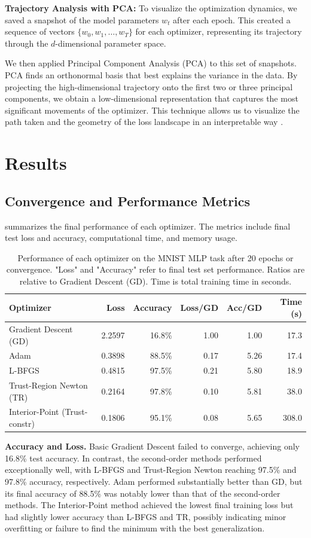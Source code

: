 \documentclass[20pt]{article}
\begin{document}
\textbf{Trajectory Analysis with PCA:}
To visualize the optimization dynamics, we saved a snapshot of the model parameters $w_t$ after each epoch. This created a sequence of vectors $\{w_0, w_1, \dots, w_T\}$ for each optimizer, representing its trajectory through the $d$-dimensional parameter space.

We then applied Principal Component Analysis (PCA) to this set of snapshots. PCA finds an orthonormal basis that best explains the variance in the data. By projecting the high-dimensional trajectory onto the first two or three principal components, we obtain a low-dimensional representation that captures the most significant movements of the optimizer. This technique allows us to visualize the path taken and the geometry of the loss landscape in an interpretable way \cite{Li2018visualizing}.

\clearpage
\section{Results} \label{results}
\subsection{Convergence and Performance Metrics}
 summarizes the final performance of each optimizer. The metrics include final test loss and accuracy, computational time, and memory usage.

\begin{table}[ht]\centering
\small %
\caption{Performance of each optimizer on the MNIST MLP task after 20 epochs or convergence. "Loss" and "Accuracy" refer to final test set performance. Ratios are relative to Gradient Descent (GD). Time is total training time in seconds.}
\label{tab:performance}
\begin{tabular}{lrrrrr}
\toprule
Optimizer & Loss & Accuracy & Loss/GD & Acc/GD & Time (s) \\
\midrule
Gradient Descent (GD) & 2.2597 & 16.8\% & 1.00 & 1.00 & 17.3 \\
Adam & 0.3898 & 88.5\% & 0.17 & 5.26 & 17.4 \\
L-BFGS & 0.4815 & 97.5\% & 0.21 & 5.80 & 18.9 \\
Trust-Region Newton (TR) & 0.2164 & 97.8\% & 0.10 & 5.81 & 38.0 \\
Interior-Point (Trust-constr) & 0.1806 & 95.1\% & 0.08 & 5.65 & 308.0 \\
\bottomrule
\end{tabular}
\end{table}
\clearpage
\textbf{Accuracy and Loss.} Basic Gradient Descent failed to converge, achieving only 16.8\% test accuracy. In contrast, the second-order methods performed exceptionally well, with L-BFGS and Trust-Region Newton reaching 97.5\% and 97.8\% accuracy, respectively. Adam performed substantially better than GD, but its final accuracy of 88.5\% was notably lower than that of the second-order methods. The Interior-Point method achieved the lowest final training loss but had slightly lower accuracy than L-BFGS and TR, possibly indicating minor overfitting or failure to find the minimum with the best generalization.
\end{document}
